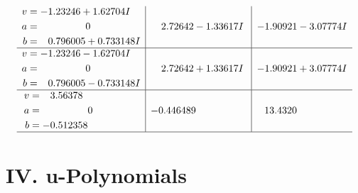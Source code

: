 \documentclass[1p]{elsarticle_modified}
\theoremstyle{definition}
\begin{document}
$$\begin{array}{c|c|c}
\begin{aligned}
v &= -1.23246 + 1.62704 I \\
a &= \phantom{-0.000000 } 0 \\
b &= \phantom{-}0.796005 + 0.733148 I\end{aligned}
 & \phantom{-}2.72642 - 1.33617 I & -1.90921 - 3.07774 I \\ \hline\begin{aligned}
v &= -1.23246 - 1.62704 I \\
a &= \phantom{-0.000000 } 0 \\
b &= \phantom{-}0.796005 - 0.733148 I\end{aligned}
 & \phantom{-}2.72642 + 1.33617 I & -1.90921 + 3.07774 I \\ \hline\begin{aligned}
v &= \phantom{-}3.56378\phantom{ +0.000000I} \\
a &= \phantom{-0.000000 } 0 \\
b &= -0.512358\phantom{ +0.000000I}\end{aligned}
 & -0.446489\phantom{ +0.000000I} & \phantom{-}13.4320\phantom{ +0.000000I}\\
 \hline 
 \end{array}$$\newpage
\newpage\renewcommand{\arraystretch}{1}
\centering \section*{ IV. u-Polynomials}
\end{document}
